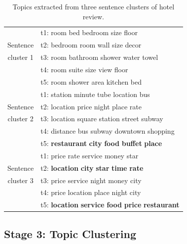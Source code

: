 \begin{table}[th]
	\centering
	\caption{Topics extracted from three sentence clusters of hotel review.}
	\label{table:overlap}
	\begin{tabular}{|c|l|}
		\hline
		& t1: room bed bedroom size floor \\
		Sentence
		&t2:  bedroom room wall size decor \\
		cluster 1
		&t3:  room bathroom shower water towel \\
		&t4:  room suite size view floor \\
		&t5:  room shower area kitchen bed \\\hline
		
		&t1:  station minute tube location bus \\
		Sentence
		&t2:  location price night place rate\\
		cluster 2
		&t3:  location square station street subway\\
		&t4:  distance bus subway downtown shopping\\
		&t5:  \textbf{restaurant} \textbf{city} \textbf{food} \textbf{buffet} \textbf{place} \\\hline
		
		&t1:  price rate service money star\\
		Sentence
		&t2:  \textbf{location} \textbf{city} \textbf{star} \textbf{time} \textbf{rate} \\
		cluster 3
		&t3:  price service night money city\\
		&t4:  price location place night city\\
		&t5:  \textbf{location} \textbf{service} \textbf{food} \textbf{price} \textbf{restaurant} \\\hline
	\end{tabular}
\end{table}


\subsection{Stage 3: Topic Clustering}
\label{sec:topic_clustering}

